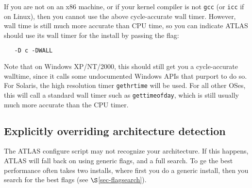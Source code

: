 \documentclass[11pt]{article}
\newcommand{\Wskip}[1]{ }
\begin{document}
If you are not on an x86 machine, or if your kernel compiler is not {\tt gcc}
(or {\tt icc} if on Linux), then you cannot use the above cycle-accurate
wall timer.  However, wall time is still much more accurate than CPU time,
so you can indicate ATLAS should use its wall timer for the install by passing
the flag:
\vspace*{-0.1in}
\begin{verbatim}
   -D c -DWALL
\end{verbatim}

Note that on Windows XP/NT/2000, this should still get you a cycle-accurate
walltime, since it calls some undocumented Windows APIs that purport to do so. 
For Solaris, the high resolution timer {\tt gethrtime} will be used.  For
all other OSes, this will call a standard wall timer such as {\tt gettimeofday},
which is still usually much more accurate than the CPU timer.

\Wskip{
\subsection{Manually setting OS, architecture, assembly dialect}
\label{sec-OS-override}

Configure's selection of operating system, architecture, assembly dialect
and SIMD vectorization type are all controlled by enumerated types.
Occasionally, configure will misdetect one of these values and so
configure provides
flags for overriding configures detecting of these features.

\subsubsection{Manually overriding the assembly dialect}
\subsubsection{Manually overriding SIMD vectorization type}
\label{sec-SIMD-override}
Also, the installer
may occasionally want to refrain from using a feature that this machine
possesses, but other machines that plan to use the same library don't.
For instance, the installation machine might have SSE3, but the installer
wants to use the same library on machines that possess only SSE2, and so
the installer wants to use only SSE2, even though this will make the library
sub-optimal on the machine possessing SSE3.  
}

\subsection{Explicitly overriding architecture detection}
\label{sec-arch-override}
The ATLAS configure script may not recognize your architecture.  If this
happens, ATLAS will fall back on using generic flags, and a full search.
To ge the best performance often takes two installs, where first you
do a generic install, then you search for the best flags 
(see $\S$\ref{sec-flagsearch}).
\end{document}
